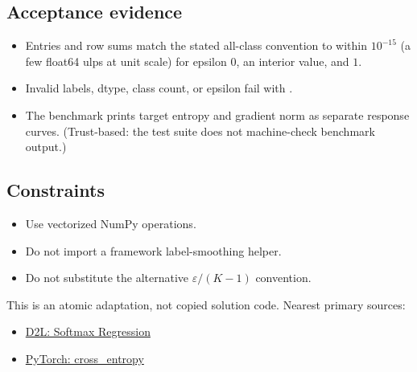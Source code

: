         \subsection{Acceptance evidence}

        \begin{evidencebox}
        \begin{itemize}
          \item Entries and row sums match the stated all-class convention to within \(10^{-15}\) (a few float64 ulps at unit scale) for epsilon $0$, an interior value, and $1$.
  \item Invalid labels, dtype, class count, or epsilon fail with .
  \item The benchmark prints target entropy and gradient norm as separate response curves. (Trust-based: the test suite does not machine-check benchmark output.)
        \end{itemize}
        \end{evidencebox}

        \subsection{Constraints}

        \begin{itemize}
          \item Use vectorized NumPy operations.
  \item Do not import a framework label-smoothing helper.
  \item Do not substitute the alternative $\varepsilon/(K-1)$ convention.
        \end{itemize}

        \begin{sourcebox}
        This is an atomic adaptation, not copied solution code. Nearest primary sources:
        \begin{itemize}
          \item \href{https://d2l.ai/chapter_linear-classification/softmax-regression.html}{D2L: Softmax Regression}
  \item \href{https://docs.pytorch.org/docs/stable/generated/torch.nn.functional.cross_entropy.html}{PyTorch: cross\_entropy}
        \end{itemize}
        \end{sourcebox}
